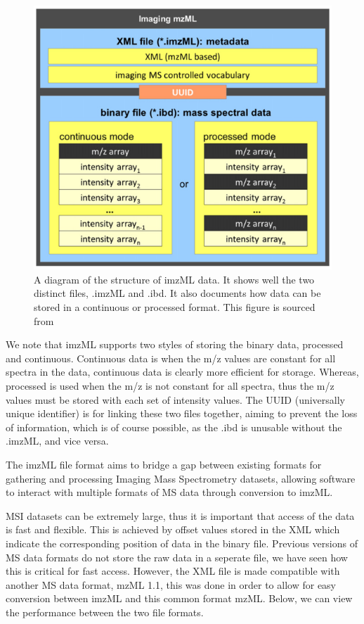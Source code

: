 \documentclass[11pt,openany]{book}
\begin{document}
\begin{figure}[H]
    \centering
    \includegraphics[scale=0.3]{./images/imzml_file_format.png}
    \caption{A diagram of the structure of imzML data. It shows well the two distinct files, .imzML and .ibd. It also documents how data can be stored in a continuous or processed format. This figure is sourced from \cite{imzml_file_article}}
    \label{fig:imzML_file_format}
\end{figure}

We note that imzML supports two styles of storing the binary data, processed and continuous. Continuous data is when the m/z values are constant for all spectra in the data, continuous data is clearly more efficient for storage. Whereas, processed is used when the m/z is not constant for all spectra, thus the m/z values must be stored with each set of intensity values. The UUID (universally unique identifier) is for linking these two files together, aiming to prevent the loss of information, which is of course possible, as the .ibd is unusable without the .imzML, and vice versa.

The imzML file format aims to bridge a gap between existing formats for gathering and processing Imaging Mass Spectrometry datasets, allowing software to interact with multiple formats of MS data through conversion to imzML.

MSI datasets can be extremely large, thus it is important that access of the data is fast and flexible. This is achieved by offset values stored in the XML which indicate the corresponding position of data in the binary file. Previous versions of MS data formats do not store the raw data in a seperate file, we have seen how this is critical for fast access. However, the XML file is made compatible with another MS data format, mzML 1.1, this was done in order to allow for easy conversion between imzML and this common format mzML. Below, we can view the performance between the two file formats.
\end{document}
